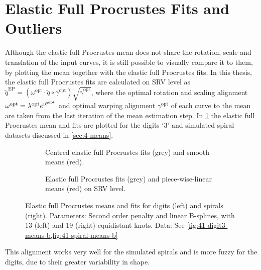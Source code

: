 \section{Elastic Full Procrustes Fits and Outliers}
\label{sec:4-pfits}
Although the elastic full Procrustes mean does not share the rotation, scale and translation of the input curves, it is still possible to visually compare it to them, by plotting the mean together with the elastic full Procrustes fits.
In this thesis, the elastic full Procrustes fits are calculated on SRV level as $\widetilde q^\mathrm{EP} = (\omega^\mathrm{opt}\cdot \widetilde q \circ \gamma^\mathrm{opt} ) \sqrt{\dot\gamma^\mathrm{opt}}$, where the optimal rotation and scaling alignment $\omega^\mathrm{opt} = \lambda^\mathrm{opt} e^{\mathrm{i}\mkern1mu \theta^\mathrm{opt}}$ and optimal warping alignment $\gamma^\mathrm{opt}$ of each curve to the mean are taken from the last iteration of the mean estimation step.
In \cref{fig:4-pfits-curve} the elastic full Procrustes mean and fits are plotted for the digits \enquote*{3} and simulated spiral datasets discussed in \cref{sec:4-means}.
\begin{figure}
  \centering
  \begin{subfigure}{\textwidth}
    \begin{subfigure}{0.48\textwidth}
    \end{subfigure}\hfill%
    \begin{subfigure}{0.48\textwidth}
    \end{subfigure}
    \caption{Centred elastic full Procrustes fits (grey) and smooth means (red).}
    \label{fig:4-pfits-curve}
  \end{subfigure}
  \begin{subfigure}{\textwidth}
    \begin{subfigure}{0.48\textwidth}
    \end{subfigure}\hfill%
    \begin{subfigure}{0.48\textwidth}
    \end{subfigure}
    \caption{Elastic full Procrustes fits (grey) and piece-wise-linear means (red) on SRV level.}
    \label{fig:4-pfits-srv}
  \end{subfigure}
  \caption{Elastic full Procrustes means and fits for digits (left) and spirals (right). Parameters: Second order penalty and linear B-splines, with 13 (left) and 19 (right) equidistant knots. Data: See \cref{fig:41-digit3-means-b,fig:41-spiral-means-b}}
  \label{fig:4-pfits}
\end{figure}
This alignment works very well for the simulated spirals and is more fuzzy for the digits, due to their greater variability in shape. 

